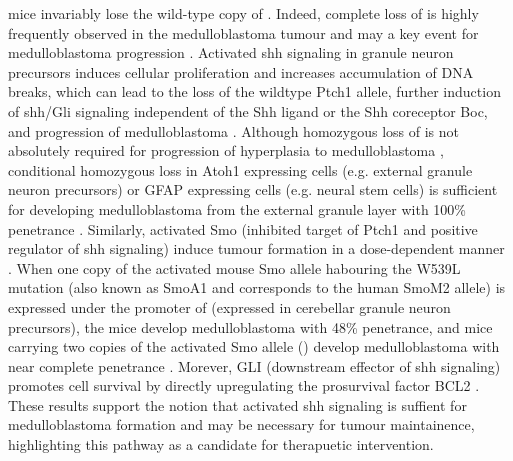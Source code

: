 mice invariably lose the wild-type copy of  . Indeed, complete loss of  is highly frequently observed in the medulloblastoma tumour and may a key event for medulloblastoma progression . Activated \gls{shh} signaling in \high{-/+} granule neuron precursors induces cellular proliferation and increases accumulation of DNA breaks, which can lead to the loss of the wildtype \gls{Ptch1} allele, further induction of \gls{shh}/Gli signaling independent of the Shh ligand or the Shh coreceptor Boc, and progression of medulloblastoma . Although homozygous loss of  is not absolutely required for progression of hyperplasia to medulloblastoma , conditional homozygous loss in Atoh1 expressing cells (e.g. external granule neuron precursors) or GFAP expressing cells (e.g. neural stem cells) is sufficient for developing medulloblastoma from the external granule layer with 100\% penetrance . Similarly, activated Smo (inhibited target of Ptch1 and positive regulator of \gls{shh} signaling) induce tumour formation in a dose-dependent manner . When one copy of the activated mouse Smo allele habouring the W539L mutation (also known as SmoA1 and corresponds to the human SmoM2 allele) is expressed under the promoter of  (expressed in cerebellar granule neuron precursors), the mice develop medulloblastoma with 48\% penetrance, and mice carrying two copies of the activated Smo allele () develop medulloblastoma with near complete penetrance . Morever, GLI (downstream effector of \gls{shh} signaling) promotes cell survival by directly upregulating the prosurvival factor BCL2 . These results support the notion that activated \gls{shh} signaling is suffient for medulloblastoma formation and may be necessary for tumour maintainence, highlighting this pathway as a candidate for therapuetic intervention.

